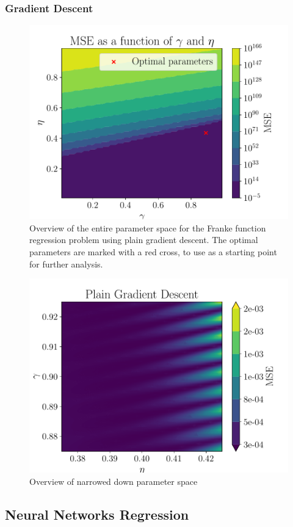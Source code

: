 \documentclass[aps,pra,english,notitlepage,reprint,nofootinbib]{revtex4-1}  %
\begin{document}
\subsubsection{Gradient Descent}
\begin{figure}[h!]
    \centering
    \includegraphics[width = .45\textwidth]{../figs/a_2_parameter_overview.pdf}
    \caption{Overview of the entire parameter space for the Franke function regression problem using plain gradient descent. The optimal parameters are marked with a red cross, to use as a starting point for further analysis.}
    \label{fig: param_overview}
\end{figure}

\begin{figure}[h!]
    \centering
    \includegraphics[width = .45\textwidth]{../figs/GD_eta_gamma.pdf}
    \caption{Overview of narrowed down parameter space}
    \label{fig: param_narrowed}
\end{figure}








\subsection{Neural Networks Regression}
\end{document}
